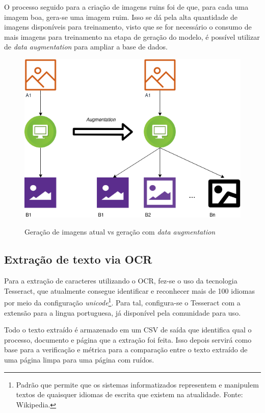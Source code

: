 O processo seguido para a criação de imagens ruins foi de que, para cada uma imagem boa, gera-se uma imagem ruim. Isso se dá pela alta quantidade de imagens disponíveis para treinamento, visto que se for necessário o consumo de mais imagens para treinamento na etapa de geração do modelo, é possível utilizar de \textit{data augmentation} para ampliar a base de dados.

\begin{figure}[H]
  \centering
  \caption{Geração de imagens atual vs geração com \textit{data augmentation}}
  \includegraphics[scale=.6]{figuras/data-augmentation.png}
  \label{fig:data-augmentation}
\end{figure}

\subsection{Extração de texto via OCR}

Para a extração de caracteres utilizando o OCR, fez-se o uso da tecnologia Tesseract, que atualmente consegue identificar e reconhecer mais de 100 idiomas por meio da configuração \textit{unicode}\footnote{
  Padrão que permite que os sistemas informatizados representem e manipulem textos de quaisquer idiomas de escrita que existem na atualidade. Fonte: Wikipedia.
}. Para tal, configura-se o Tesseract com a extensão para a lingua portuguesa, já disponível pela comunidade para uso.

Todo o texto extraído é armazenado em um CSV de saída que identifica qual o processo, documento e página que a extração foi feita. Isso depois servirá como base para a verificação e métrica para a comparação entre o texto extraído de uma página limpa para uma página com ruídos.

